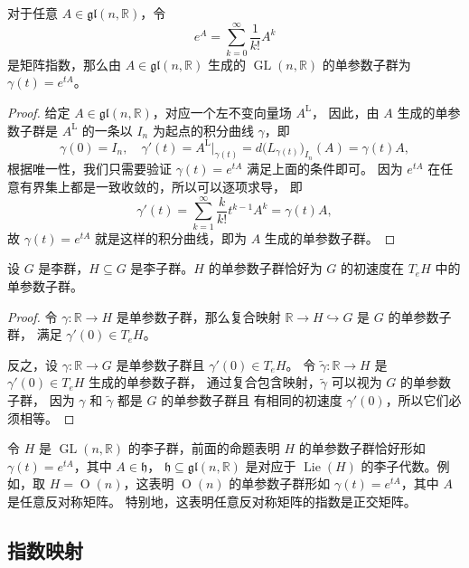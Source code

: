 \documentclass[fontset=none]{Notes}
\DeclareMathOperator\GL{GL}
\DeclareMathOperator\Orth{O}
\DeclareMathOperator\Lie{Lie}
\newcommand{\LL}{{\mathrm{L}}}
\newcommand{\lie}[1]{\mathfrak{#1}}
\begin{document}
\begin{proposition}
  对于任意 $A\in\lie{gl}(n,\mathbb{R})$，令
  \[
    e^A=\sum_{k=0}^\infty\frac{1}{k! }A^k  
  \]
  是矩阵指数，那么由 $A\in\lie{gl}(n,\mathbb{R})$ 生成的
  $\GL(n,\mathbb{R})$ 的单参数子群为 $\gamma(t)=e^{tA}$。
\end{proposition}
\begin{proof}
  给定 $A\in\lie{gl}(n,\mathbb{R})$，对应一个左不变向量场 $A^{\LL}$，
  因此，由 $A$ 生成的单参数子群是 $A^{\LL}$ 的一条以 $I_n$ 为起点的积分曲线
  $\gamma$，即
  \[
    \gamma(0)=I_n,  \quad
    \gamma'(t)=A^{\LL}|_{\gamma(t)}=d\bigl(L_{\gamma(t)}\bigr)_{I_n}
    \left(A\right)=\gamma(t)A,
  \]
  根据唯一性，我们只需要验证 $\gamma(t)=e^{tA}$ 满足上面的条件即可。
  因为 $e^{tA}$ 在任意有界集上都是一致收敛的，所以可以逐项求导，
  即
  \[
    \gamma'(t)=\sum_{k=1}^\infty\frac{k}{k!}t^{k-1}A^k
    =\gamma(t)A,  
  \]
  故 $\gamma(t)=e^{tA}$ 就是这样的积分曲线，即为 $A$ 生成的单参数子群。
\end{proof}

\begin{proposition}
  设 $G$ 是李群，$H\subseteq G$ 是李子群。$H$ 的单参数子群恰好为
  $G$ 的初速度在 $T_eH$ 中的单参数子群。
\end{proposition}
\begin{proof}
  令 $\gamma:\mathbb{R}\to H$ 是单参数子群，那么复合映射
  $\mathbb{R}\to H\hookrightarrow G$ 是 $G$ 的单参数子群，
  满足 $\gamma'(0)\in T_eH$。

  反之，设 $\gamma:\mathbb{R}\to G$ 是单参数子群且 $\gamma'(0)\in T_eH$。
  令 $\tilde{\gamma}:\mathbb{R}\to H$ 是 $\gamma'(0)\in T_eH$ 生成的单参数子群，
  通过复合包含映射，$\tilde{\gamma}$ 可以视为 $G$ 的单参数子群，
  因为 $\gamma$ 和 $\tilde{\gamma}$ 都是 $G$ 的单参数子群且
  有相同的初速度 $\gamma'(0)$，所以它们必须相等。
\end{proof}

\begin{example}
  令 $H$ 是 $\GL(n,\mathbb{R})$ 的李子群，前面的命题表明
  $H$ 的单参数子群恰好形如 $\gamma(t)=e^{tA}$，其中 $A\in\lie h$，
  $\lie h\subseteq \lie{gl}(n,\mathbb{R})$ 是对应于 $\Lie(H)$
  的李子代数。例如，取 $H=\Orth(n)$，这表明 $\Orth(n)$
  的单参数子群形如 $\gamma(t)=e^{tA}$，其中 $A$ 是任意反对称矩阵。
  特别地，这表明任意反对称矩阵的指数是正交矩阵。
\end{example}

\subsection{指数映射}
\end{document}
